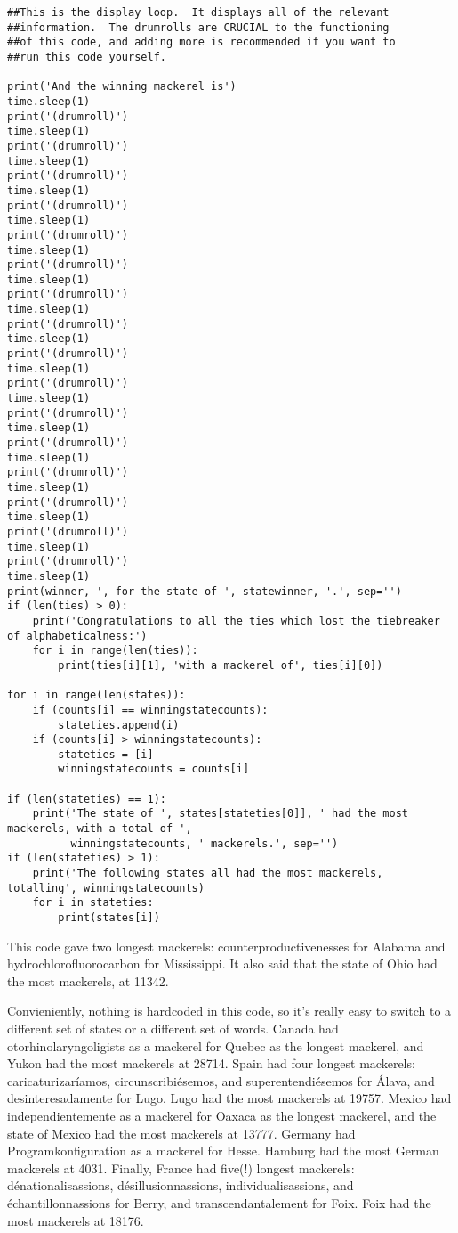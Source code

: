 \documentclass[11pt]{article}
\theoremstyle{definition}
\begin{document}
\begin{verbatim}
##This is the display loop.  It displays all of the relevant
##information.  The drumrolls are CRUCIAL to the functioning
##of this code, and adding more is recommended if you want to
##run this code yourself.

print('And the winning mackerel is')
time.sleep(1)
print('(drumroll)')
time.sleep(1)
print('(drumroll)')
time.sleep(1)
print('(drumroll)')
time.sleep(1)
print('(drumroll)')
time.sleep(1)
print('(drumroll)')
time.sleep(1)
print('(drumroll)')
time.sleep(1)
print('(drumroll)')
time.sleep(1)
print('(drumroll)')
time.sleep(1)
print('(drumroll)')
time.sleep(1)
print('(drumroll)')
time.sleep(1)
print('(drumroll)')
time.sleep(1)
print('(drumroll)')
time.sleep(1)
print('(drumroll)')
time.sleep(1)
print('(drumroll)')
time.sleep(1)
print('(drumroll)')
time.sleep(1)
print('(drumroll)')
time.sleep(1)
print(winner, ', for the state of ', statewinner, '.', sep='')
if (len(ties) > 0):
    print('Congratulations to all the ties which lost the tiebreaker of alphabeticalness:')
    for i in range(len(ties)):
        print(ties[i][1], 'with a mackerel of', ties[i][0])

for i in range(len(states)):
    if (counts[i] == winningstatecounts):
        stateties.append(i)
    if (counts[i] > winningstatecounts):
        stateties = [i]
        winningstatecounts = counts[i]

if (len(stateties) == 1):
    print('The state of ', states[stateties[0]], ' had the most mackerels, with a total of ',
          winningstatecounts, ' mackerels.', sep='')
if (len(stateties) > 1):
    print('The following states all had the most mackerels, totalling', winningstatecounts)
    for i in stateties:
        print(states[i])
\end{verbatim}
This code gave two longest mackerels: counterproductivenesses for Alabama and hydrochlorofluorocarbon for Mississippi.  It also said that the state of Ohio had the most mackerels, at 11342.

Convieniently, nothing is hardcoded in this code, so it's really easy to switch to a different set of states or a different set of words.  Canada had otorhinolaryngoligists as a mackerel for Quebec as the longest mackerel, and Yukon had the most mackerels at 28714.  Spain had four longest mackerels: caricaturizar\'iamos, circunscribi\'esemos, and superentendiésemos for \'Alava, and desinteresadamente for Lugo.  Lugo had the most mackerels at 19757.  Mexico had independientemente as a mackerel for Oaxaca as the longest mackerel, and the state of Mexico had the most mackerels at 13777.  Germany had Programkonfiguration as a mackerel for Hesse.  Hamburg had the most German mackerels at 4031.  Finally, France had five(!) longest mackerels: d\'enationalisassions, d\'esillusionnassions, individualisassions, and \'echantillonnassions for Berry, and transcendantalement for Foix.  Foix had the most mackerels at 18176.
\end{document}
